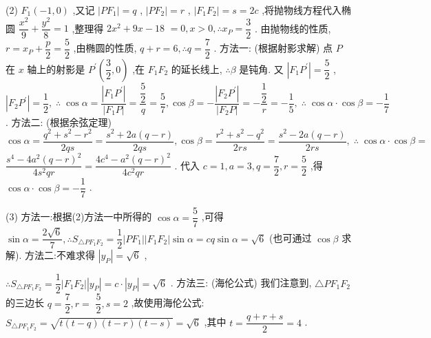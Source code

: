 (2) ${F}_{1}\left( {-1,0}\right)$ ,又记 $\left| {P{F}_{1}}\right|  = q$ , $\left| {P{F}_{2}}\right|  = r$ , $\left| {{F}_{1}{F}_{2}}\right|  = s = {2c}$ ,将抛物线方程代入椭圆 $\dfrac{{x}^{2}}{9} + \dfrac{{y}^{2}}{8} = 1$ ,整理得 $2{x}^{2} + {9x} - {18}$  $= 0,x > 0,\therefore {x}_{P} = \dfrac{3}{2}$ . 由抛物线的性质, $r = {x}_{P} + \dfrac{p}{2} = \dfrac{5}{2}$ ,由椭圆的性质, $q + r = 6,\therefore q = \dfrac{7}{2}$ . 方法一: (根据射影求解) 点 $P$ 在 $x$ 轴上的射影是 ${P}^{\prime }\left( {\dfrac{3}{2},0}\right)$ ,在 ${F}_{1}{F}_{2}$ 的延长线上, $\therefore \beta$ 是钝角. 又 $\left| {{F}_{1}{P}^{\prime }}\right|  = \dfrac{5}{2}$ , $\left| {{F}_{2}{P}^{\prime }}\right|  = \dfrac{1}{2},\;\therefore \;\cos \alpha  = \dfrac{\left| {F}_{1}{P}^{\prime }\right| }{\left| {F}_{1}P\right| } = \dfrac{\dfrac{5}{2}}{q} = \dfrac{5}{7},\cos \beta  =  - \dfrac{\left| {F}_{2}{P}^{\prime }\right| }{\left| {F}_{2}P\right| } =  - \dfrac{\dfrac{1}{2}}{r} =  - \dfrac{1}{5},\;\therefore \;\cos \alpha  \cdot  \cos \beta  =  - \dfrac{1}{7}$ . 方法二: (根据余弦定理) $\cos \alpha  = \dfrac{{q}^{2} + {s}^{2} - {r}^{2}}{2qs} = \dfrac{{s}^{2} + {2a}\left( {q - r}\right) }{2qs},\cos \beta  = \dfrac{{r}^{2} + {s}^{2} - {q}^{2}}{2rs} = \dfrac{{s}^{2} - {2a}\left( {q - r}\right) }{2rs},\;\therefore \;\cos \alpha  \cdot  \cos \beta  =$  $\dfrac{{s}^{4} - 4{a}^{2}{\left( q - r\right) }^{2}}{4{s}^{2}{qr}} = \dfrac{4{c}^{4} - {a}^{2}{\left( q - r\right) }^{2}}{4{c}^{2}{qr}}$ . 代入 $c = 1,a = 3,q = \dfrac{7}{2},r = \dfrac{5}{2}$ ,得 $\cos \alpha  \cdot  \cos \beta  =  - \dfrac{1}{7}$ .

(3) 方法一:根据(2)方法一中所得的 $\cos \alpha  = \dfrac{5}{7}$ ,可得 $\sin \alpha  = \dfrac{2\sqrt{6}}{7},\therefore {S}_{\bigtriangleup P{F}_{1}{F}_{2}} = \dfrac{1}{2}\left| {P{F}_{1}}\right| \left| {{F}_{1}{F}_{2}}\right| \sin \alpha  = {cq}\sin \alpha  = \sqrt{6}$ (也可通过 $\cos \beta$ 求解). 方法二:不难求得 $\left| {y}_{P}\right|  = \sqrt{6}$ ,

$\therefore {S}_{\bigtriangleup P{F}_{1}{F}_{2}} = \dfrac{1}{2}\left| {{F}_{1}{F}_{2}}\right| \left| {y}_{P}\right|  = c \cdot  \left| {y}_{P}\right|  = \sqrt{6}$ . 方法三: (海伦公式) 我们注意到, $\bigtriangleup P{F}_{1}{F}_{2}$ 的三边长 $q = \dfrac{7}{2},r =$  $\dfrac{5}{2},s = 2$ ,故使用海伦公式: ${S}_{\bigtriangleup P{F}_{1}{F}_{2}} = \sqrt{t\left( {t - q}\right) \left( {t - r}\right) \left( {t - s}\right) } = \sqrt{6}$ ,其中 $t = \dfrac{q + r + s}{2} = 4$ .

